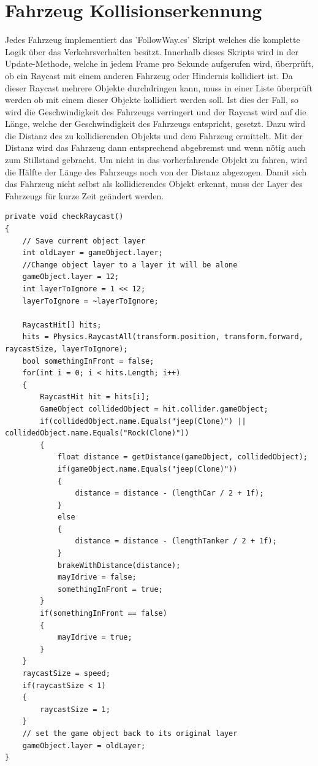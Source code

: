 \section{Fahrzeug Kollisionserkennung}
\label{Fahrzeug_Kollisionserkennung}

Jedes Fahrzeug implementiert das 'FollowWay.cs' Skript welches die komplette Logik über das Verkehrsverhalten besitzt. Innerhalb dieses Skripts wird in der Update-Methode, welche in jedem Frame pro Sekunde aufgerufen wird, überprüft, ob ein Raycast mit einem anderen Fahrzeug oder Hindernis kollidiert ist. Da dieser Raycast mehrere Objekte durchdringen kann, muss in einer Liste überprüft werden ob mit einem dieser Objekte kollidiert werden soll. Ist dies der Fall, so wird die Geschwindigkeit des Fahrzeugs verringert und der Raycast wird auf die Länge, welche der Geschwindigkeit des Fahrzeugs entspricht, gesetzt. Dazu wird die Distanz des zu kollidierenden Objekts und dem Fahrzeug ermittelt. Mit der Distanz wird das Fahrzeug dann entsprechend abgebremst und wenn nötig auch zum Stillstand gebracht. Um nicht in das vorherfahrende Objekt zu fahren, wird die Hälfte der Länge des Fahrzeugs noch von der Distanz abgezogen. Damit sich das Fahrzeug nicht selbst als kollidierendes Objekt erkennt, muss der Layer des Fahrzeugs für kurze Zeit geändert werden.

\begin{lstlisting}[caption={Erkennen von anderen Fahrzeugen und Hindernissen},label={lst:Hinderniss_erkennen}]
private void checkRaycast()
{
	// Save current object layer
	int oldLayer = gameObject.layer;
	//Change object layer to a layer it will be alone
	gameObject.layer = 12;
	int layerToIgnore = 1 << 12;
	layerToIgnore = ~layerToIgnore;

	RaycastHit[] hits;		
	hits = Physics.RaycastAll(transform.position, transform.forward, raycastSize, layerToIgnore);
	bool somethingInFront = false;
	for(int i = 0; i < hits.Length; i++)
	{
		RaycastHit hit = hits[i];
		GameObject collidedObject = hit.collider.gameObject;
		if(collidedObject.name.Equals("jeep(Clone)") || collidedObject.name.Equals("Rock(Clone)"))
		{
			float distance = getDistance(gameObject, collidedObject);
			if(gameObject.name.Equals("jeep(Clone)"))
			{
				distance = distance - (lengthCar / 2 + 1f);
			}
			else
			{
				distance = distance - (lengthTanker / 2 + 1f);
			}
			brakeWithDistance(distance);
			mayIdrive = false;
			somethingInFront = true;
		}
		if(somethingInFront == false)
		{
			mayIdrive = true;
		}
	}
	raycastSize = speed;
	if(raycastSize < 1)
	{
		raycastSize = 1;
	}
	// set the game object back to its original layer
	gameObject.layer = oldLayer;
}
\end{lstlisting}

